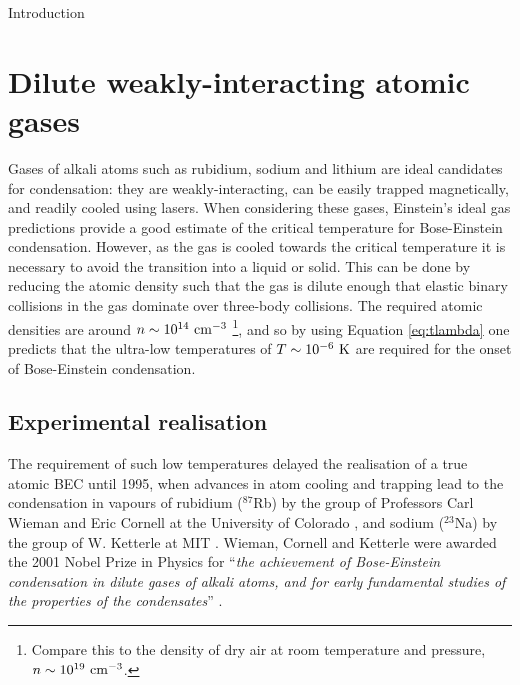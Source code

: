 \begin{chapter}{\label{cha:bose_gases}Introduction}
\section{Dilute weakly-interacting atomic gases}
Gases of alkali atoms such as rubidium, sodium and lithium are ideal candidates for condensation: they are weakly-interacting, can be easily trapped magnetically, and readily cooled using lasers. When considering these gases, Einstein's ideal gas predictions provide a good estimate of the critical temperature for Bose-Einstein condensation.  However, as the gas is cooled towards the critical temperature it is necessary to avoid the transition into a liquid or solid. This can be done by reducing the atomic density such that the gas is dilute enough that elastic binary collisions in the gas dominate over three-body collisions. The required atomic densities are around $n \sim 10^{14}~{\rm cm}^{-3}$ \footnote{Compare this to the density of dry air at room temperature and pressure, $n \sim 10^{19}~{\rm cm}^{-3}$.}, and so by using Equation \ref{eq:tlambda} one predicts that the ultra-low temperatures of $T \sim 10^{-6}~{\rm K}$ are required for the onset of Bose-Einstein condensation.

\subsection{Experimental realisation}
The requirement of such low temperatures delayed the realisation of a true atomic BEC until 1995, when advances in atom cooling and trapping \cite{billphillips,chu98,Cohen-Tannoudji} lead to the condensation in vapours of rubidium ($^{87}$Rb) by the group of Professors Carl Wieman and Eric Cornell at the University of Colorado \cite{Anderson198}, and sodium ($^{23}$Na) by the group of W. Ketterle at MIT \cite{PhysRevLett.75.3969}. Wieman, Cornell and Ketterle were awarded the 2001 Nobel Prize in Physics for ``{\it the achievement of Bose-Einstein condensation in dilute gases of alkali atoms, and for early fundamental studies of the properties of the condensates}'' \cite{nobel01}.


\end{chapter}
